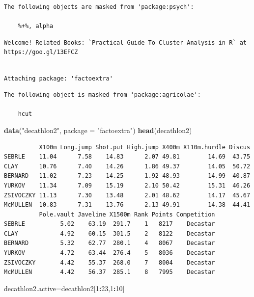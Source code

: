 \documentclass[12pt,brazil,oneside]{book}
\newenvironment{Shaded}{\begin{snugshade}}{\end{snugshade}}
\newcommand{\DataTypeTok}[1]{\textcolor[rgb]{0.13,0.29,0.53}{#1}}
\newcommand{\DecValTok}[1]{\textcolor[rgb]{0.00,0.00,0.81}{#1}}
\newcommand{\KeywordTok}[1]{\textcolor[rgb]{0.13,0.29,0.53}{\textbf{#1}}}
\newcommand{\NormalTok}[1]{#1}
\newcommand{\OperatorTok}[1]{\textcolor[rgb]{0.81,0.36,0.00}{\textbf{#1}}}
\newcommand{\StringTok}[1]{\textcolor[rgb]{0.31,0.60,0.02}{#1}}
\begin{document}
\begin{verbatim}
The following objects are masked from 'package:psych':

    %+%, alpha
\end{verbatim}

\begin{verbatim}
Welcome! Related Books: `Practical Guide To Cluster Analysis in R` at https://goo.gl/13EFCZ
\end{verbatim}

\begin{verbatim}

Attaching package: 'factoextra'
\end{verbatim}

\begin{verbatim}
The following object is masked from 'package:agricolae':

    hcut
\end{verbatim}

\begin{Shaded}
\begin{Highlighting}[]
\KeywordTok{data}\NormalTok{(}\StringTok{"decathlon2"}\NormalTok{, }\DataTypeTok{package =} \StringTok{"factoextra"}\NormalTok{)}
\KeywordTok{head}\NormalTok{(decathlon2)}
\end{Highlighting}
\end{Shaded}

\begin{verbatim}
          X100m Long.jump Shot.put High.jump X400m X110m.hurdle Discus
SEBRLE    11.04      7.58    14.83      2.07 49.81        14.69  43.75
CLAY      10.76      7.40    14.26      1.86 49.37        14.05  50.72
BERNARD   11.02      7.23    14.25      1.92 48.93        14.99  40.87
YURKOV    11.34      7.09    15.19      2.10 50.42        15.31  46.26
ZSIVOCZKY 11.13      7.30    13.48      2.01 48.62        14.17  45.67
McMULLEN  10.83      7.31    13.76      2.13 49.91        14.38  44.41
          Pole.vault Javeline X1500m Rank Points Competition
SEBRLE          5.02    63.19  291.7    1   8217    Decastar
CLAY            4.92    60.15  301.5    2   8122    Decastar
BERNARD         5.32    62.77  280.1    4   8067    Decastar
YURKOV          4.72    63.44  276.4    5   8036    Decastar
ZSIVOCZKY       4.42    55.37  268.0    7   8004    Decastar
McMULLEN        4.42    56.37  285.1    8   7995    Decastar
\end{verbatim}

\begin{Shaded}
\begin{Highlighting}[]
\NormalTok{decathlon2.active=decathlon2[}\DecValTok{1}\OperatorTok{:}\DecValTok{23}\NormalTok{,}\DecValTok{1}\OperatorTok{:}\DecValTok{10}\NormalTok{]}
\end{Highlighting}
\end{Shaded}
\end{document}
